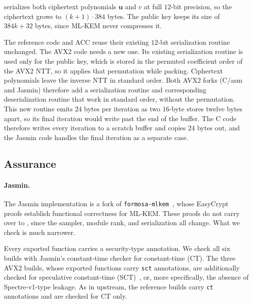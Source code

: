 \kaiburr serializes both ciphertext polynomials $\mathbf{u}$ and $v$
at full $12$-bit precision, so the ciphertext grows to $(k+1)\cdot 384$ bytes.
The public key keeps its size of $384k+32$ bytes, since ML-KEM never
compresses it.

The reference code and ACC reuse their existing $12$-bit serialization routine unchanged. 
The AVX2 code needs a new one. Its existing serialization routine is used only for the public key,
which is stored in the permuted coefficient order of the AVX2 NTT, so it
applies that permutation while packing. Ciphertext polynomials leave the
inverse NTT in standard order. Both AVX2 forks (C/asm and Jasmin) therefore 
add a serialization routine and corresponding deserialization routine 
that work in standard order, without the permutation.
This new routine emits $24$ bytes per iteration as two $16$-byte stores twelve
bytes apart, so its final iteration would write past the end of the buffer.
The C code therefore writes every iteration to a scratch buffer and copies $24$ bytes out, and the Jasmin
code handles the final iteration as a separate case.


\subsection{Assurance}
\label{sec:impl:assurance}

\paragraph{Jasmin.}
The Jasmin implementation is a fork of \texttt{formosa-mlkem}~\cite{TCHES:ABBGLL23},
whose EasyCrypt proofs establish functional correctness for ML-KEM. These
proofs do not carry over to \kaiburr, since the sampler, module rank,
and serialization all change. What we check is much narrower.

Every exported function carries a security-type annotation.
We check all six builds with Jasmin's constant-time checker for constant-time (CT). The three AVX2 builds,
whose exported functions carry \texttt{sct} annotations, are additionally checked for speculative constant-time
(SCT)~\cite{SP:SBGLOP23}, or, more specifically, the absence of Spectre-v1-type leakage.
As in upstream, the reference builds carry \texttt{ct} annotations and are checked for CT only.

